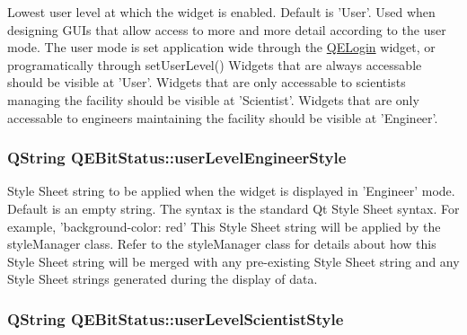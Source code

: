 Lowest user level at which the widget is enabled. Default is 'User'. Used when designing GUIs that allow access to more and more detail according to the user mode. The user mode is set application wide through the \hyperlink{classQELogin}{QELogin} widget, or programatically through setUserLevel() Widgets that are always accessable should be visible at 'User'. Widgets that are only accessable to scientists managing the facility should be visible at 'Scientist'. Widgets that are only accessable to engineers maintaining the facility should be visible at 'Engineer'. \hypertarget{classQEBitStatus_acca0e670c1c589dcad2afd499d2f2336}{
\subsubsection[{userLevelEngineerStyle}]{\setlength{\rightskip}{0pt plus 5cm}QString QEBitStatus::userLevelEngineerStyle}}
\label{classQEBitStatus_acca0e670c1c589dcad2afd499d2f2336}
Style Sheet string to be applied when the widget is displayed in 'Engineer' mode. Default is an empty string. The syntax is the standard Qt Style Sheet syntax. For example, 'background-\/color: red' This Style Sheet string will be applied by the styleManager class. Refer to the styleManager class for details about how this Style Sheet string will be merged with any pre-\/existing Style Sheet string and any Style Sheet strings generated during the display of data. \hypertarget{classQEBitStatus_ae5d057164351722b3d0f9847daa36f9b}{
\subsubsection[{userLevelScientistStyle}]{\setlength{\rightskip}{0pt plus 5cm}QString QEBitStatus::userLevelScientistStyle}}
\label{classQEBitStatus_ae5d057164351722b3d0f9847daa36f9b}
